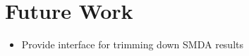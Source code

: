 \section{Future Work}
\label{sect:maw_future_work}

\begin{itemize}

    \item Provide interface for trimming down SMDA results

\end{itemize}
